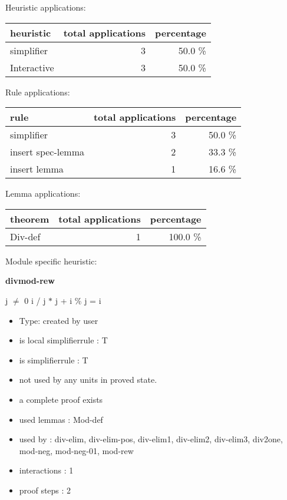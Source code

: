 \documentclass[a4paper]{article}
\begin{document}
\medskip


Heuristic applications:

\begin{supertabular}{l|r|r}
heuristic	& total applications & percentage \\ \hline
simplifier & 3 & 50.0 \% \\
Interactive & 3 & 50.0 \% \\

\end{supertabular}

Rule applications:

\begin{supertabular}{l|r|r}
rule	        & total applications & percentage \\ \hline
simplifier & 3 & 50.0 \% \\
insert spec-lemma & 2 & 33.3 \% \\
insert lemma & 1 & 16.6 \% \\

\end{supertabular}

Lemma applications:

\begin{supertabular}{l|r|r}
theorem	        & total applications & percentage \\ \hline
Div-def & 1 & 100.0 \% \\

\end{supertabular}

Module specific heuristic:

\pagebreak

{\LARGE\bf divmod-rew}\label{lemma-divmod-rew}

\medskip

j $\neq$ 0 \Fol i / j $*$ j + i \% j = i

\begin{itemize}

\item Type: created by user

\item is local simplifierrule : T
\item is simplifierrule : T
\item not used by any units in proved state.
\item       a complete proof exists
\item       used lemmas  : Mod-def
\item       used by      : div-elim, div-elim-pos, div-elim1, div-elim2, div-elim3, div2one, mod-neg, mod-neg-01, mod-rew
\item       interactions : 1
\item       proof steps  : 2
\end{itemize}
\end{document}
